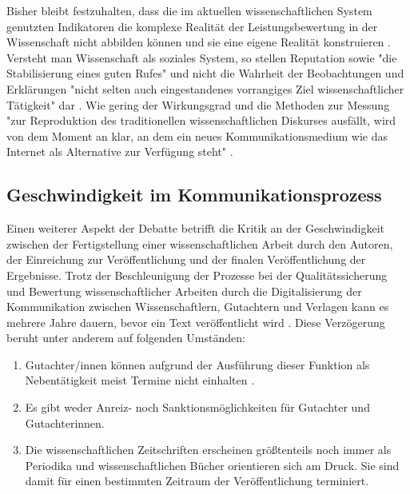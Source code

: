 Bisher bleibt festzuhalten, dass die im aktuellen wissenschaftlichen System genutzten Indikatoren die komplexe Realität der Leistungsbewertung in der Wissenschaft nicht abbilden können und sie eine eigene Realität konstruieren \cite[:188]{Hornbostel_1997}. Versteht man Wissenschaft als soziales System, so stellen Reputation sowie "die Stabilisierung eines guten Rufes" und nicht die Wahrheit der Beobachtungen und Erklärungen "nicht selten auch eingestandenes vorrangiges Ziel wissenschaftlicher Tätigkeit" dar \cite[:237]{Luhmann_1970}. Wie gering der Wirkungsgrad und die Methoden zur Messung "zur Reproduktion des traditionellen wissenschaftlichen Diskurses ausfällt, wird von dem Moment an klar, an dem ein neues Kommunikationsmedium wie das Internet als Alternative zur Verfügung steht" \cite{Rost_1998}.

\subsection{Geschwindigkeit im Kommunikationsprozess}

Einen weiterer Aspekt der Debatte betrifft die Kritik an der Geschwindigkeit zwischen der Fertigstellung einer wissenschaftlichen Arbeit durch den Autoren, der Einreichung zur Veröffentlichung und der finalen Veröffentlichung der Ergebnisse. Trotz der Beschleunigung der Prozesse bei der Qualitätssicherung und Bewertung wissenschaftlicher Arbeiten durch die Digitalisierung der Kommunikation zwischen Wissenschaftlern, Gutachtern und Verlagen kann es mehrere Jahre dauern, bevor ein Text veröffentlicht wird \cite{Curry_2015} \cite{Nosek_2012} \cite{Smith_2006}. Diese Verzögerung beruht unter anderem auf folgenden Umständen:

\begin{enumerate}
\item Gutachter/innen können aufgrund der Ausführung dieser Funktion als Nebentätigkeit meist Termine nicht einhalten \cite{Bar_2009}.
\item Es gibt weder Anreiz- noch Sanktionsmöglichkeiten für Gutachter und Gutachterinnen.
\item Die wissenschaftlichen Zeitschriften erscheinen größtenteils noch immer als Periodika und wissenschaftlichen Bücher orientieren sich am Druck. Sie sind damit für einen bestimmten Zeitraum der Veröffentlichung terminiert.
\end{enumerate}

